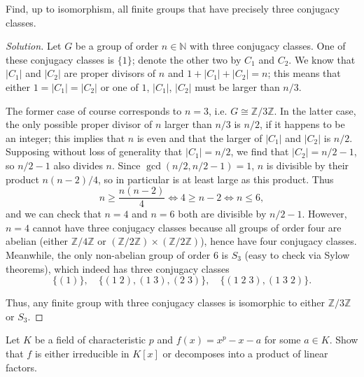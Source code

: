 \documentclass[10pt]{article}
\providecommand{\NN}{\mathbb N}
\providecommand{\ZZ}{\mathbb Z}
\newenvironment{soln}{\begin{proof}[Solution]}{\end{proof}}
\providecommand{\abs}[1]{\left|#1\right|}
\begin{document}
\begin{problem}
    Find, up to isomorphism, all finite groups that have
    precisely three conjugacy classes.
\end{problem}

\begin{soln}
    Let $G$ be a group of order $n\in\NN$ with three conjugacy classes.
    One of these conjugacy classes is $\{1\}$;
    denote the other two by $C_1$ and $C_2$.
    We know that $\abs{C_1}$ and $\abs{C_2}$ are proper divisors of $n$
    and $1 + \abs{C_1} + \abs{C_2} = n$;
    this means that either $1 = \abs{C_1} = \abs{C_2}$
    or one of $1$, $\abs{C_1}$, $\abs{C_2}$ must be larger than $n/3$.

    The former case of course corresponds to $n = 3$, i.e.
    $G\cong\ZZ/3\ZZ$. In the latter case, the only possible proper divisor of $n$
    larger than $n/3$ is $n/2$, if it happens to be an integer;
    this implies that $n$ is even and that
    the larger of $\abs{C_1}$ and $\abs{C_2}$ is $n/2$.
    Supposing without loss of generality that $\abs{C_1} = n/2$,
    we find that $\abs{C_2} = n/2 - 1$, so $n/2 - 1$ also divides $n$.
    Since $\gcd(n/2, n/2 - 1) = 1$, $n$ is divisible by their product
    $n(n-2)/4$, so in particular is at least large as this product. Thus
    \begin{equation*}
	n\ge \frac{n(n-2)}4 \iff 4\ge n-2 \iff n\le 6,
    \end{equation*}
    and we can check that $n=4$ and $n=6$ both are divisible by $n/2 - 1$.
    However, $n=4$ cannot have three conjugacy classes
    because all groups of order four are abelian (either $\ZZ/4\ZZ$ or
    $(\ZZ/2\ZZ)\times(\ZZ/2\ZZ)$), hence have four conjugacy classes.
    Meanwhile, the only non-abelian group of order $6$ is $S_3$
    (easy to check via Sylow theorems),
    which indeed has three conjugacy classes
    \begin{equation*}
	\{(1)\},\quad \{(1\; 2), (1\;3), (2\;3)\},\quad
	\{(1\;2\;3), (1\;3\;2)\}.
    \end{equation*}

    Thus, any finite group with three conjugacy classes
    is isomorphic to either $\boxed{\ZZ/3\ZZ}$ or $\boxed{S_3}$.
\end{soln}

\begin{problem}
    Let $K$ be a field of characteristic $p$
    and $f(x) = x^p - x - a$ for some $a\in K$.
    Show that $f$ is either irreducible in $K[x]$
    or decomposes into a product of linear factors.
\end{problem}
\end{document}
